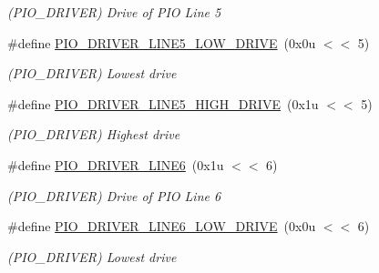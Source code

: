 \begin{DoxyCompactItemize}
\begin{DoxyCompactList}\small\item\em (P\+I\+O\+\_\+\+D\+R\+I\+V\+ER) Drive of P\+IO Line 5 \end{DoxyCompactList}\item 
\mbox{\label{group__SAMS70__PIO_ga269764df2045050efd656b580b7a5338}} 
\#define \mbox{\hyperlink{group__SAMS70__PIO_ga269764df2045050efd656b580b7a5338}{P\+I\+O\+\_\+\+D\+R\+I\+V\+E\+R\+\_\+\+L\+I\+N\+E5\+\_\+\+L\+O\+W\+\_\+\+D\+R\+I\+VE}}~(0x0u $<$$<$ 5)
\begin{DoxyCompactList}\small\item\em (P\+I\+O\+\_\+\+D\+R\+I\+V\+ER) Lowest drive \end{DoxyCompactList}\item 
\mbox{\label{group__SAMS70__PIO_ga1057e8896c2146ad9e70c84255096065}} 
\#define \mbox{\hyperlink{group__SAMS70__PIO_ga1057e8896c2146ad9e70c84255096065}{P\+I\+O\+\_\+\+D\+R\+I\+V\+E\+R\+\_\+\+L\+I\+N\+E5\+\_\+\+H\+I\+G\+H\+\_\+\+D\+R\+I\+VE}}~(0x1u $<$$<$ 5)
\begin{DoxyCompactList}\small\item\em (P\+I\+O\+\_\+\+D\+R\+I\+V\+ER) Highest drive \end{DoxyCompactList}\item 
\mbox{\label{group__SAMS70__PIO_ga70e7629ab4e61d43938855116d2e76c0}} 
\#define \mbox{\hyperlink{group__SAMS70__PIO_ga70e7629ab4e61d43938855116d2e76c0}{P\+I\+O\+\_\+\+D\+R\+I\+V\+E\+R\+\_\+\+L\+I\+N\+E6}}~(0x1u $<$$<$ 6)
\begin{DoxyCompactList}\small\item\em (P\+I\+O\+\_\+\+D\+R\+I\+V\+ER) Drive of P\+IO Line 6 \end{DoxyCompactList}\item 
\mbox{\label{group__SAMS70__PIO_gaf1d14669e91ed56df0d527800e40f47d}} 
\#define \mbox{\hyperlink{group__SAMS70__PIO_gaf1d14669e91ed56df0d527800e40f47d}{P\+I\+O\+\_\+\+D\+R\+I\+V\+E\+R\+\_\+\+L\+I\+N\+E6\+\_\+\+L\+O\+W\+\_\+\+D\+R\+I\+VE}}~(0x0u $<$$<$ 6)
\begin{DoxyCompactList}\small\item\em (P\+I\+O\+\_\+\+D\+R\+I\+V\+ER) Lowest drive \end{DoxyCompactList}\item 

\end{DoxyCompactItemize}
